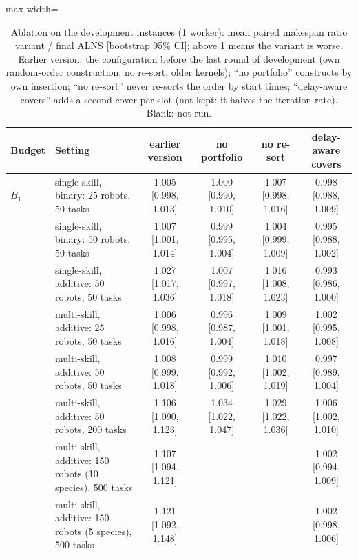 \begin{table}[h]
\centering
\small
\caption{Ablation on the development instances (1 worker): mean paired makespan ratio variant / final ALNS [bootstrap 95\% CI]; above 1 means the variant is worse. Earlier version: the configuration before the last round of development (own random-order construction, no re-sort, older kernels); ``no portfolio'' constructs by own insertion; ``no re-sort'' never re-sorts the order by start times; ``delay-aware covers'' adds a second cover per slot (not kept: it halves the iteration rate). Blank: not run.}
\label{tab:supp-ablation}
\begin{adjustbox}{max width=\textwidth}\begin{tabular}{llcccc}
\toprule
Budget & Setting & earlier version & no portfolio & no re-sort & delay-aware covers \\
\midrule
$B_1$ & single-skill, binary: 25 robots, 50 tasks & 1.005 {\scriptsize [0.998, 1.013]} & 1.000 {\scriptsize [0.990, 1.010]} & 1.007 {\scriptsize [0.998, 1.016]} & 0.998 {\scriptsize [0.988, 1.009]} \\
 & single-skill, binary: 50 robots, 50 tasks & 1.007 {\scriptsize [1.001, 1.014]} & 0.999 {\scriptsize [0.995, 1.004]} & 1.004 {\scriptsize [0.999, 1.009]} & 0.995 {\scriptsize [0.988, 1.002]} \\
 & single-skill, additive: 50 robots, 50 tasks & 1.027 {\scriptsize [1.017, 1.036]} & 1.007 {\scriptsize [0.997, 1.018]} & 1.016 {\scriptsize [1.008, 1.023]} & 0.993 {\scriptsize [0.986, 1.000]} \\
 & multi-skill, additive: 25 robots, 50 tasks & 1.006 {\scriptsize [0.998, 1.016]} & 0.996 {\scriptsize [0.987, 1.004]} & 1.009 {\scriptsize [1.001, 1.018]} & 1.002 {\scriptsize [0.995, 1.008]} \\
 & multi-skill, additive: 50 robots, 50 tasks & 1.008 {\scriptsize [0.999, 1.018]} & 0.999 {\scriptsize [0.992, 1.006]} & 1.010 {\scriptsize [1.002, 1.019]} & 0.997 {\scriptsize [0.989, 1.004]} \\
 & multi-skill, additive: 50 robots, 200 tasks & 1.106 {\scriptsize [1.090, 1.123]} & 1.034 {\scriptsize [1.022, 1.047]} & 1.029 {\scriptsize [1.022, 1.036]} & 1.006 {\scriptsize [1.002, 1.010]} \\
 & multi-skill, additive: 150 robots (10 species), 500 tasks & 1.107 {\scriptsize [1.094, 1.121]} &  &  & 1.002 {\scriptsize [0.994, 1.009]} \\
 & multi-skill, additive: 150 robots (5 species), 500 tasks & 1.121 {\scriptsize [1.092, 1.148]} &  &  & 1.002 {\scriptsize [0.998, 1.006]} \\

\end{tabular}
\end{adjustbox}
\end{table}
